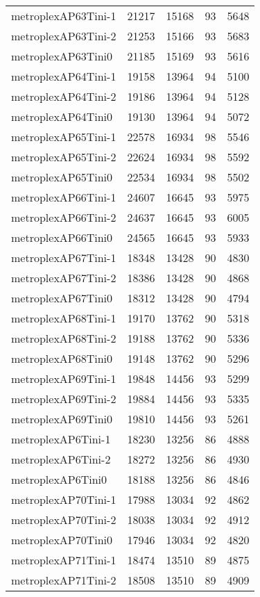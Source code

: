\begin{longtable}{lrrrr}
metroplexAP63Tini-1 & 21217 & 15168 & 93 & 5648 \\
metroplexAP63Tini-2 & 21253 & 15166 & 93 & 5683 \\
metroplexAP63Tini0 & 21185 & 15169 & 93 & 5616 \\
metroplexAP64Tini-1 & 19158 & 13964 & 94 & 5100 \\
metroplexAP64Tini-2 & 19186 & 13964 & 94 & 5128 \\
metroplexAP64Tini0 & 19130 & 13964 & 94 & 5072 \\
metroplexAP65Tini-1 & 22578 & 16934 & 98 & 5546 \\
metroplexAP65Tini-2 & 22624 & 16934 & 98 & 5592 \\
metroplexAP65Tini0 & 22534 & 16934 & 98 & 5502 \\
metroplexAP66Tini-1 & 24607 & 16645 & 93 & 5975 \\
metroplexAP66Tini-2 & 24637 & 16645 & 93 & 6005 \\
metroplexAP66Tini0 & 24565 & 16645 & 93 & 5933 \\
metroplexAP67Tini-1 & 18348 & 13428 & 90 & 4830 \\
metroplexAP67Tini-2 & 18386 & 13428 & 90 & 4868 \\
metroplexAP67Tini0 & 18312 & 13428 & 90 & 4794 \\
metroplexAP68Tini-1 & 19170 & 13762 & 90 & 5318 \\
metroplexAP68Tini-2 & 19188 & 13762 & 90 & 5336 \\
metroplexAP68Tini0 & 19148 & 13762 & 90 & 5296 \\
metroplexAP69Tini-1 & 19848 & 14456 & 93 & 5299 \\
metroplexAP69Tini-2 & 19884 & 14456 & 93 & 5335 \\
metroplexAP69Tini0 & 19810 & 14456 & 93 & 5261 \\
metroplexAP6Tini-1 & 18230 & 13256 & 86 & 4888 \\
metroplexAP6Tini-2 & 18272 & 13256 & 86 & 4930 \\
metroplexAP6Tini0 & 18188 & 13256 & 86 & 4846 \\
metroplexAP70Tini-1 & 17988 & 13034 & 92 & 4862 \\
metroplexAP70Tini-2 & 18038 & 13034 & 92 & 4912 \\
metroplexAP70Tini0 & 17946 & 13034 & 92 & 4820 \\
metroplexAP71Tini-1 & 18474 & 13510 & 89 & 4875 \\
metroplexAP71Tini-2 & 18508 & 13510 & 89 & 4909 \\

\end{longtable}

